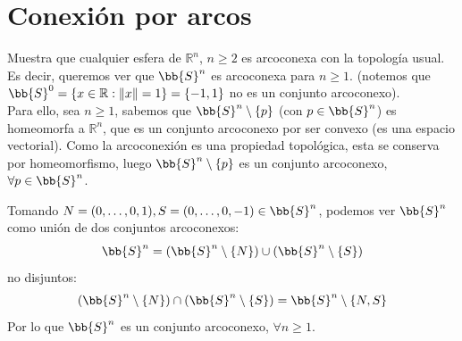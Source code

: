 \setcounter{section}{-1}
\section{Conexión por arcos}

\begin{ejercicio}
    Muestra que cualquier esfera de $\mathbb{R}^n$, $n\geq 2$ es arcoconexa con la topología usual.\\

    \noindent
    Es decir, queremos ver que $\bb{S}^n$ es arcoconexa para $n\geq 1$. \newline (notemos que $\bb{S}^0 = \{x\in \mathbb{R} : \|x\| = 1\} = \{-1,1\}$ no es un conjunto arcoconexo).\\

    \noindent
    Para ello, sea $n\geq 1$, sabemos que $\bb{S}^n\setminus\{p\}$ (con $p\in \bb{S}^n$) es homeomorfa a $\mathbb{R}^{n}$, que es un conjunto arcoconexo por ser convexo (es una espacio vectorial). Como la arcoconexión es una propiedad topológica, esta se conserva por homeomorfismo, luego $\bb{S}^n\setminus \{p\}$ es un conjunto arcoconexo, $\forall p\in \bb{S}^n$.

    Tomando $N = (0,\ldots,0,1), S =(0,\ldots,0,-1) \in \bb{S}^n$, podemos ver $\bb{S}^n$ como unión de dos conjuntos arcoconexos:
    \begin{equation*}
        \bb{S}^n = (\bb{S}^n\setminus\{N\}) \cup (\bb{S}^n\setminus\{S\})
    \end{equation*}
    no disjuntos:
    \begin{equation*}
        (\bb{S}^n\setminus\{N\}) \cap (\bb{S}^n\setminus\{S\}) = \bb{S}^n\setminus\{N,S\}
    \end{equation*}
    Por lo que $\bb{S}^n$ es un conjunto arcoconexo, $\forall n\geq 1$.
\end{ejercicio}


